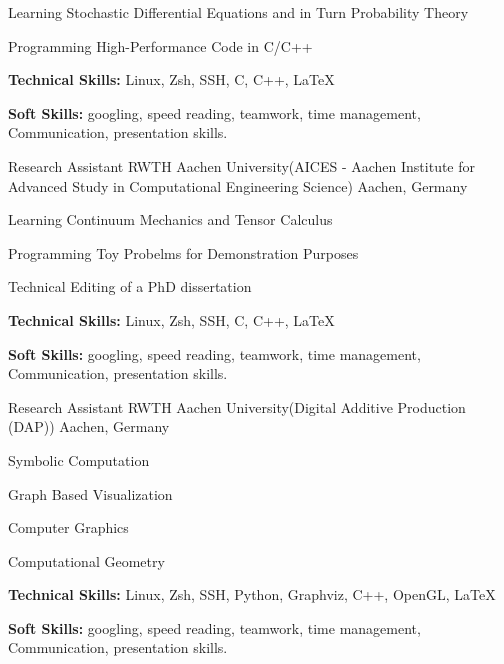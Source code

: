 \begin{cventries}
{\begin{cvitems}
      \item {Learning Stochastic Differential Equations and in Turn Probability Theory} 
      \item {Programming High-Performance Code in C/C++}
      \item {\textbf{Technical Skills:} Linux, Zsh, SSH, C, C++, LaTeX}
      \item {\textbf{Soft Skills:} googling, speed reading, teamwork, time management, Communication, presentation skills.}
      \end{cvitems}
    }
  \cventry
    {Research Assistant} %
    {RWTH Aachen University(AICES - Aachen Institute for Advanced Study in Computational Engineering Science)} %
    {Aachen, Germany} %
    {} %
    {
      \begin{cvitems} %
      \item {Learning Continuum Mechanics and Tensor Calculus}
      \item {Programming Toy Probelms for Demonstration Purposes}
      \item {Technical Editing of a PhD dissertation}
      \item {\textbf{Technical Skills:} Linux, Zsh, SSH, C, C++, LaTeX}
      \item {\textbf{Soft Skills:} googling, speed reading, teamwork, time management, Communication, presentation skills.}
      \end{cvitems}
    }
  \cventry
    {Research Assistant} %
    {RWTH Aachen University(Digital Additive Production (DAP))} %
    {Aachen, Germany} %
    {} %
    {
      \begin{cvitems} %
      \item {Symbolic Computation}
      \item {Graph Based Visualization}
      \item {Computer Graphics}
      \item {Computational Geometry}
      \item {\textbf{Technical Skills:} Linux, Zsh, SSH, Python, Graphviz, C++, OpenGL, LaTeX}
      \item {\textbf{Soft Skills:} googling, speed reading, teamwork, time management, Communication, presentation skills.}
      \end{cvitems}
    }
\end{cventries}
